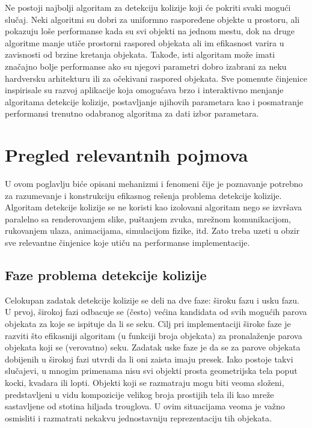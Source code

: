 \documentclass[12pt,oneside]{memoir}
\begin{document}
Ne postoji najbolji algoritam za detekciju kolizije koji će pokriti svaki mogući slučaj. 
Neki algoritmi su dobri za uniformno raspoređene objekte u prostoru, ali pokazuju loše performanse kada su svi objekti na jednom mestu, 
dok na druge algoritme manje utiče prostorni raspored objekata ali im efikasnost varira u zavisnosti od brzine kretanja objekata.
Takođe, isti algoritam može imati značajno bolje performanse ako su njegovi parametri dobro 
izabrani za neku hardversku arhitekturu ili za očekivani raspored objekata. 
Sve pomenute činjenice inspirisale su razvoj aplikacije koja omogućava brzo i interaktivno menjanje
algoritama detekcije kolizije, postavljanje njihovih parametara kao 
i  posmatranje performansi trenutno odabranog algoritma za dati izbor parametara.

\chapter{Pregled relevantnih pojmova}
\label{sec:karakteristike}

U ovom poglavlju biće opisani mehanizmi i fenomeni čije je poznavanje potrebno za razumevanje i konstrukciju 
efikasnog rešenja problema detekcije kolizije.
Algoritam detekcije kolizije se ne koristi kao izolovani algoritam nego se izvršava paralelno sa renderovanjem slike,
puštanjem zvuka, mrežnom komunikacijom, rukovanjem ulaza, animacijama, simulacijom fizike, itd. 
Zato treba uzeti u obzir sve relevantne činjenice koje utiču na performanse implementacije.

\section{Faze problema detekcije kolizije}

Celokupan zadatak detekcije kolizije se deli na dve faze: široku fazu i usku fazu. 
U prvoj, širokoj fazi
odbacuje se (često) većina kandidata od svih mogućih parova objekata za koje se ispituje da li se seku.
Cilj pri implementaciji široke faze je razviti što efikasniji algoritam (u funkciji broja objekata) 
za pronalaženje parova objekata koji se (verovatno) seku.
Zadatak uske faze je da se za parove objekata dobijenih u širokoj fazi utvrdi da li oni zaista imaju presek.
Iako postoje takvi slučajevi, u mnogim primenama nisu svi objekti prosta geometrijska tela poput kocki, kvadara ili lopti.
Objekti koji se razmatraju mogu biti veoma složeni, predstavljeni u vidu kompozicije velikog broja prostijih tela ili kao mreže sastavljene od stotina hiljada trouglova.
U ovim situacijama veoma je važno osmisliti i razmatrati nekakvu jednostavniju reprezentaciju tih objekata.
\end{document}
